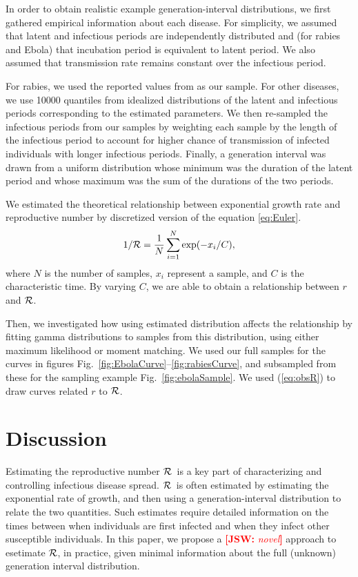 \documentclass[12pt,]{article}
\newcommand{\RR}{\ensuremath{{\cal R}}}
\newcommand{\eref}[1]{(\ref{eq:#1})}
\newcommand{\fref}[1]{Fig.~\ref{fig:#1}}
\newcommand{\frange}[2]{Fig.~\ref{fig:#1}--\ref{fig:#2}}
\newcommand{\comment}[3]{\textcolor{#1}{\textbf{[#2: }\textit{#3}\textbf{]}}}
\newcommand{\jsw}[1]{\comment{red}{JSW}{#1}}
\begin{document}
In order to obtain realistic example generation-interval distributions, we first gathered empirical information about each disease. For simplicity, we assumed that latent and infectious periods are independently distributed and (for rabies and Ebola) that incubation period is equivalent to latent period. We also assumed that transmission rate remains constant over the infectious period.

For rabies, we used the reported values from \cite{HampDush09} as our sample.
For other diseases, we use 10000 quantiles from idealized distributions of the latent and infectious periods corresponding to the estimated parameters.
We then re-sampled the infectious periods from our samples by weighting each sample by the length of the infectious period to account for higher chance of transmission of infected individuals with longer infectious periods. 
Finally, a generation interval was drawn from a uniform distribution whose minimum was the duration of the latent period and whose maximum was the sum of the durations of the two periods.

We estimated the theoretical relationship between exponential growth rate and reproductive number by discretized version of the equation \ref{eq:Euler}.
\begin{equation}
1/\RR = \frac{1}{N} \sum_{i=1}^{N} \exp(-x_i/C),
\label{eq:obsR}
\end{equation}
where $N$ is the number of samples, $x_i$ represent a sample, and $C$ is the characteristic time. By varying $C$, we are able to obtain a relationship between $r$ and $\RR$.

Then, we investigated how using estimated distribution affects the relationship by fitting gamma distributions to samples from this distribution, using either maximum likelihood or moment matching. We used our full samples for the curves in figures \frange{EbolaCurve}{rabiesCurve}, and subsampled from these for the sampling example \fref{ebolaSample}. We used \eref{obsR} to draw curves related $r$ to $\RR$.

\section{Discussion}

Estimating the reproductive number \RR\ is a key part of characterizing and controlling infectious disease spread. \RR\ is often estimated by estimating the exponential rate of growth, and then using a generation-interval distribution to relate the two quantities. 
Such estimates require detailed information on the times between when individuals are first infected and when they infect other susceptible individuals. 
In this paper, we propose a \jsw{novel} approach to esetimate \RR, in practice, given minimal information about the full (unknown) generation interval distribution.
\end{document}

